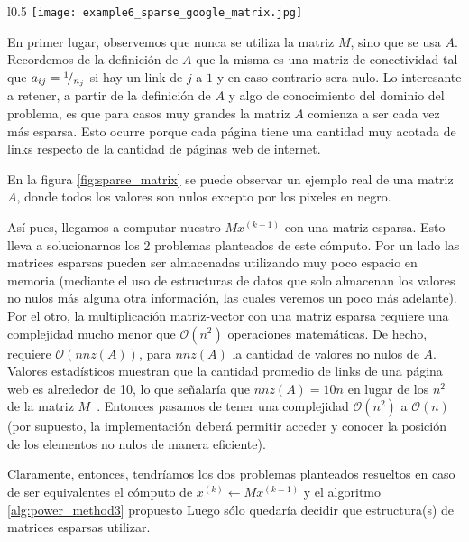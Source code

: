 \begin{wrapfigure}[24]{l}{0.5\textwidth}
    \texttt{[image: example6\_sparse\_google\_matrix.jpg]}
    \caption{Ejemplo de Matriz Esparsa. Los valores no nulos est\'an indicados
    en negro~\cite[p.34]{Langville2006}}
    \label{fig:sparse_matrix}
\end{wrapfigure}

\par En primer lugar, observemos que nunca se utiliza la matriz $M$, sino que se
usa $A$. Recordemos de la definici\'on de $A$ que la misma es una matriz de
conectividad tal que $a_{ij} = {}^{1}\!/_{n_j}$ si hay un link de $j$ a $1$ y en
caso contrario sera nulo. Lo interesante a retener, a partir de la definici\'on
de $A$ y algo de conocimiento del dominio del problema, es que para casos muy
grandes la matriz $A$ comienza a ser cada vez m\'as esparsa. Esto ocurre porque
cada p\'agina tiene una cantidad muy acotada de links respecto de la cantidad de
p\'aginas web de internet.

\par En la figura \ref{fig:sparse_matrix} se puede observar un ejemplo real de
una matriz $A$, donde todos los valores son nulos excepto por los pixeles en
negro.

\par As\'i pues, llegamos a computar nuestro $Mx^{(k-1)}$ con una matriz
esparsa. Esto lleva a solucionarnos los 2 problemas planteados de este
c\'omputo. Por un lado las matrices esparsas pueden ser almacenadas utilizando
muy poco espacio en memoria (mediante el uso de estructuras de datos que solo
almacenan los valores no nulos m\'as alguna otra informaci\'on, las cuales
veremos un poco m\'as adelante). Por el otro, la multiplicaci\'on matriz-vector
con una matriz esparsa requiere una complejidad mucho menor que
$\mathcal{O}(n^2)$ operaciones matem\'aticas. De hecho, requiere
$\mathcal{O}(nnz(A))$, para $nnz(A)$ la cantidad de valores no nulos de $A$.
Valores estad\'isticos muestran que la cantidad promedio de links de una
p\'agina web es alrededor de 10, lo que se\~nalar\'ia que $nnz(A)=10n$ en
lugar de los $n^2$ de la matriz $M$~\cite[p.34]{Langville2006}. Entonces pasamos
de tener una complejidad $\mathcal{O}(n^2)$ a $\mathcal{O}(n)$ (por supuesto,
la implementaci\'on deber\'a permitir acceder y conocer la posici\'on de los
elementos no nulos de manera eficiente).

\par Claramente, entonces, tendr\'iamos los dos problemas planteados resueltos
en caso de ser equivalentes el c\'omputo de $x^{(k)}\gets Mx^{(k-1)}$ y el
algoritmo \ref{alg:power_method3} propuesto  Luego s\'olo quedar\'ia decidir que
estructura(s) de matrices esparsas utilizar.

